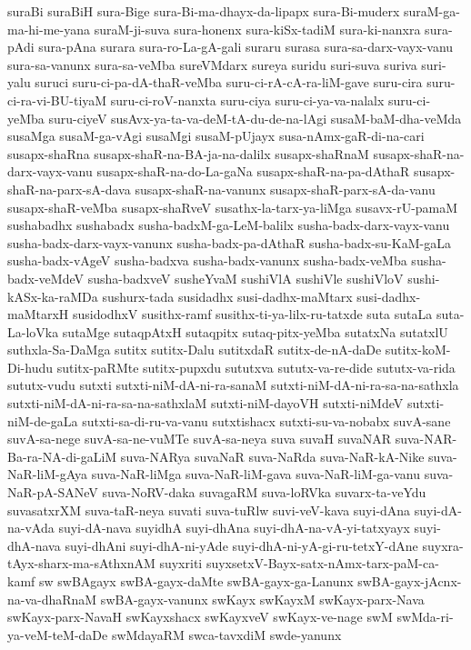 {suraBi
suraBiH
sura-Bige
sura-Bi-ma-dhayx-da-lipapx
sura-Bi-muderx
suraM-ga-ma-hi-me-yana
suraM-ji-suva
sura-honenx
sura-kiSx-tadiM
sura-ki-nanxra
sura-pAdi
sura-pAna
surara
sura-ro-La-gA-gali
suraru
surasa
sura-sa-darx-vayx-vanu
sura-sa-vanunx
sura-sa-veMba
sureVMdarx
sureya
suridu
suri-suva
suriva
suri-yalu
suruci
suru-ci-pa-dA-thaR-veMba
suru-ci-rA-cA-ra-liM-gave
suru-cira
suru-ci-ra-vi-BU-tiyaM
suru-ci-roV-nanxta
suru-ciya
suru-ci-ya-va-nalalx
suru-ci-yeMba
suru-ciyeV
susAvx-ya-ta-va-deM-tA-du-de-na-lAgi
susaM-baM-dha-veMda
susaMga
susaM-ga-vAgi
susaMgi
susaM-pUjayx
susa-nAmx-gaR-di-na-cari
susapx-shaRna
susapx-shaR-na-BA-ja-na-dalilx
susapx-shaRnaM
susapx-shaR-na-darx-vayx-vanu
susapx-shaR-na-do-La-gaNa
susapx-shaR-na-pa-dAthaR
susapx-shaR-na-parx-sA-dava
susapx-shaR-na-vanunx
susapx-shaR-parx-sA-da-vanu
susapx-shaR-veMba
susapx-shaRveV
susathx-la-tarx-ya-liMga
susavx-rU-pamaM
sushabadhx
sushabadx
susha-badxM-ga-LeM-balilx
susha-badx-darx-vayx-vanu
susha-badx-darx-vayx-vanunx
susha-badx-pa-dAthaR
susha-badx-su-KaM-gaLa
susha-badx-vAgeV
susha-badxva
susha-badx-vanunx
susha-badx-veMba
susha-badx-veMdeV
susha-badxveV
susheYvaM
sushiVlA
sushiVle
sushiVloV
sushi-kASx-ka-raMDa
sushurx-tada
susidadhx
susi-dadhx-maMtarx
susi-dadhx-maMtarxH
susidodhxV
susithx-ramf
susithx-ti-ya-lilx-ru-tatxde
suta
sutaLa
suta-La-loVka
sutaMge
sutaqpAtxH
sutaqpitx
sutaq-pitx-yeMba
sutatxNa
sutatxlU
suthxla-Sa-DaMga
sutitx
sutitx-Dalu
sutitxdaR
sutitx-de-nA-daDe
sutitx-koM-Di-hudu
sutitx-paRMte
sutitx-pupxdu
sututxva
sututx-va-re-dide
sututx-va-rida
sututx-vudu
sutxti
sutxti-niM-dA-ni-ra-sanaM
sutxti-niM-dA-ni-ra-sa-na-sathxla
sutxti-niM-dA-ni-ra-sa-na-sathxlaM
sutxti-niM-dayoVH
sutxti-niMdeV
sutxti-niM-de-gaLa
sutxti-sa-di-ru-va-vanu
sutxtishacx
sutxti-su-va-nobabx
suvA-sane
suvA-sa-nege
suvA-sa-ne-vuMTe
suvA-sa-neya
suva
suvaH
suvaNAR
suva-NAR-Ba-ra-NA-di-gaLiM
suva-NARya
suvaNaR
suva-NaRda
suva-NaR-kA-Nike
suva-NaR-liM-gAya
suva-NaR-liMga
suva-NaR-liM-gava
suva-NaR-liM-ga-vanu
suva-NaR-pA-SANeV
suva-NoRV-daka
suvagaRM
suva-loRVka
suvarx-ta-veYdu
suvasatxrXM
suva-taR-neya
suvati
suva-tuRlw
suvi-veV-kava
suyi-dAna
suyi-dA-na-vAda
suyi-dA-nava
suyidhA
suyi-dhAna
suyi-dhA-na-vA-yi-tatxyayx
suyi-dhA-nava
suyi-dhAni
suyi-dhA-ni-yAde
suyi-dhA-ni-yA-gi-ru-tetxY-dAne
suyxra-tAyx-sharx-ma-sAthxnAM
suyxriti
suyxsetxV-Bayx-satx-nAmx-tarx-paM-ca-kamf
sw
swBAgayx
swBA-gayx-daMte
swBA-gayx-ga-Lanunx
swBA-gayx-jAcnx-na-va-dhaRnaM
swBA-gayx-vanunx
swKayx
swKayxM
swKayx-parx-Nava
swKayx-parx-NavaH
swKayxshacx
swKayxveV
swKayx-ve-nage
swM
swMda-ri-ya-veM-teM-daDe
swMdayaRM
swca-tavxdiM
swde-yanunx
}
